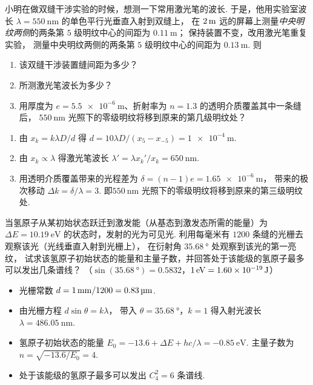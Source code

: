 \documentclass[quiet]{ctexart}
\begin{document}
\begin{problem}[本题8分]
  小明在做双缝干涉实验的时候，想测一下常用激光笔的波长.
  于是，他用实验室波长 $\lambda = \qty{550}\nm$ 的单色平行光垂直入射到双缝上，
  在 $\qty2\m$ 远的屏幕上测量\emph{中央明纹两侧}的两条第 $5$ 级明纹中心的间距为 $\qty{0.11}\m$；
  保持装置不变，改用激光笔重复实验，
  测量中央明纹两侧的两条第 $5$ 级明纹中心的间距为 $\qty{0.13}\m$. 则
  \begin{enumerate}
    \item 该双缝干涉装置缝间距为多少？
    \item 所测激光笔波长为多少？
    \item 用厚度为 $e = \qty{5.5e-6}\m$、折射率为 $n = 1.3$ 的透明介质覆盖其中一条缝后，
    $\qty{550}\nm$ 光照下的零级明纹将移到原来的第几级明纹处？
  \end{enumerate}
\end{problem}
\begin{solution}\leavevmode
  \begin{enumerate}
    \item 由 $x_k = k\lambda D/d$ 得
    $d = 10 \lambda D/(x_5 - x_{-5}) = \qty{1e-4}\m$.
    \item 由 $x_k \propto \lambda$ 得激光笔波长
    $\lambda' = \lambda x_k'/x_k = \qty{650}\nm$.
    \item 用透明介质覆盖带来的光程差为 $\delta = (n - 1)e = \qty{1.65e-6}\m$，
    带来的极次移动 $\Delta k = \delta / \lambda = 3$.
    即$\qty{550}\nm$ 光照下的零级明纹将移到原来的第三级明纹处.
  \end{enumerate}
\end{solution}

\begin{problem}
  当氢原子从某初始状态跃迁到激发能（从基态到激发态所需的能量）为 $\Delta E = \qty{10.19}\eV$
  的状态时，发射的光为可见光. 利用每毫米有 $1200$ 条缝的光栅去观察该光（光线垂直入射到光栅上），
  在衍射角 $\qty{35.68}\degree$ 处观察到该光的第一亮纹，
  试求该氢原子初始状态的能量和主量子数，并回答处于该能级的氢原子最多可以发出几条谱线？
  （$\sin(\qty{35.68}\degree) = 0.5832$，$\qty1\eV = \qty{1.60e-19}\J$）
\end{problem}
\begin{solution}\leavevmode
  \begin{itemize}
    \item 光栅常数 $d = \qty1\mm/1200 = \qty{0.83}\um$.
    \item 由光栅方程 $d\sin\theta = k\lambda$，
    带入 $\theta = \qty{35.68}\degree$，$k = 1$
    得入射光波长 $\lambda = \qty{486.05}\nm$.
    \item 氢原子初始状态的能量
    $E_0 = -13.6 + \Delta E + hc/\lambda = -\qty{0.85}\eV$.
    主量子数为 $n = \sqrt{-13.6/E_0} = 4$.
    \item 处于该能级的氢原子最多可以发出 $C_4^2 = 6$ 条谱线.
  \end{itemize}
\end{solution}
\end{document}
